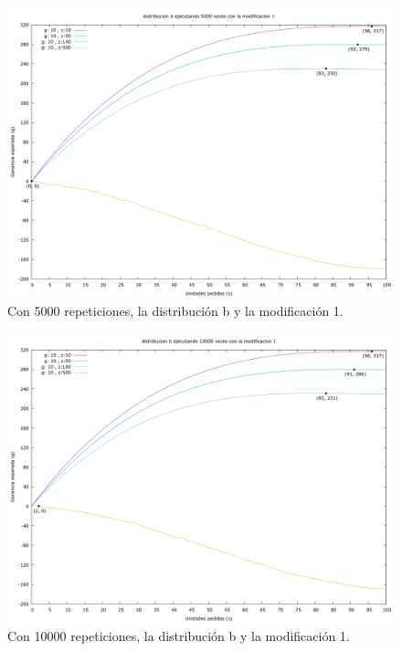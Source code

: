 \documentclass[12pt, spanish]{article}
\begin{document}
\begin{figure}[H]
	\centering
	\includegraphics[scale = 0.2]{prob_b/datos_b_5000_1.png}
	\caption{Con 5000 repeticiones, la distribución b y la modificación 1.}
	\label{fig:ej1_a_5000}

\end{figure}


\begin{figure}[H]
	\centering
	\includegraphics[scale = 0.2]{prob_b/datos_b_10000_1.png}
	\caption{Con 10000 repeticiones, la distribución b y la modificación 1.}
	\label{fig:ej1_a_10000}

\end{figure}
\end{document}
